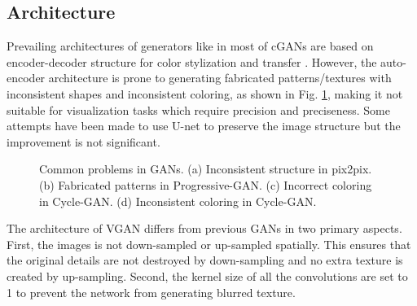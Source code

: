 \documentclass[10pt,conference,a4paper]{IEEEtran}
\begin{document}
\subsection{Architecture}
\label{sec:arch}
Prevailing architectures of generators like in most of cGANs \cite{cgan} are based on encoder-decoder structure for color stylization and transfer \cite{pix2pix,cyclegan}.
However, the auto-encoder architecture is prone to generating fabricated patterns/textures with inconsistent shapes and inconsistent coloring, as shown in Fig. \ref{fig:inconsistent_gans}, making it not suitable for visualization tasks which require precision and preciseness.
Some attempts have been made to use U-net to preserve the image structure \cite{pix2pix,dualgan} but the improvement is not significant.

\begin{figure}[!t]
    \centering
    \caption{Common problems in GANs.
    (a) Inconsistent structure in pix2pix. (b) Fabricated patterns in Progressive-GAN.
    (c) Incorrect coloring in Cycle-GAN. (d) Inconsistent coloring in Cycle-GAN.}
    \label{fig:inconsistent_gans}

\end{figure}

The architecture of VGAN differs from previous GANs in two primary aspects. First, the images is not down-sampled or up-sampled spatially. This ensures that the original details are not destroyed by down-sampling and no extra texture is created by up-sampling. Second, the kernel size of all the convolutions are set to 1 to prevent the network from generating blurred texture.
\end{document}
